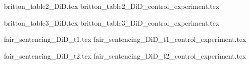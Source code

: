 \documentclass{article}
\begin{document}
{britton_table2_DiD.tex}
{britton_table2_DiD_control_experiment.tex}

{britton_table3_DiD.tex}
{britton_table3_DiD_control_experiment.tex}

{fair_sentencing_DiD_t1.tex}
{fair_sentencing_DiD_t1_control_experiment.tex}

{fair_sentencing_DiD_t2.tex}
{fair_sentencing_DiD_t2_control_experiment.tex}





\clearpage
\nocite{*}
\singlespacing




\clearpage
\end{document}
